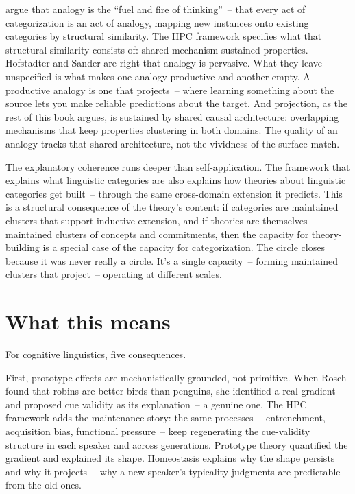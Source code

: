 \textcite{hofstadter2013} argue that analogy is the \enquote{fuel and fire of thinking}~-- that every act of categorization is an act of analogy, mapping new instances onto existing categories by structural similarity. The HPC framework specifies what that structural similarity consists of: shared mechanism-sustained properties. Hofstadter and Sander are right that analogy is pervasive. What they leave unspecified is what makes one analogy productive and another empty. A productive analogy is one that projects~-- where learning something about the source lets you make reliable predictions about the target. And projection, as the rest of this book argues, is sustained by shared causal architecture: overlapping mechanisms that keep properties clustering in both domains. The quality of an analogy tracks that shared architecture, not the vividness of the surface match.

The explanatory coherence runs deeper than self-application. The framework that explains what linguistic categories are also explains how theories about linguistic categories get built~-- through the same cross-domain extension it predicts. This is a structural consequence of the theory's content: if categories are maintained clusters that support inductive extension, and if theories are themselves maintained clusters of concepts and commitments, then the capacity for theory-building is a special case of the capacity for categorization. The circle closes because it was never really a circle. It's a single capacity~-- forming maintained clusters that project~-- operating at different scales.

\section{What this means}
\label{sec:17:what-this-means}

For cognitive linguistics, five consequences.

First, prototype effects are mechanistically grounded, not primitive. When Rosch found that robins are better birds than penguins, she identified a real gradient and proposed cue validity as its explanation~-- a genuine one. The HPC framework adds the maintenance story: the same processes~-- entrenchment, acquisition bias, functional pressure~-- keep regenerating the cue-validity structure in each speaker and across generations. Prototype theory quantified the gradient and explained its shape. Homeostasis explains why the shape persists and why it projects~-- why a new speaker's typicality judgments are predictable from the old ones.

